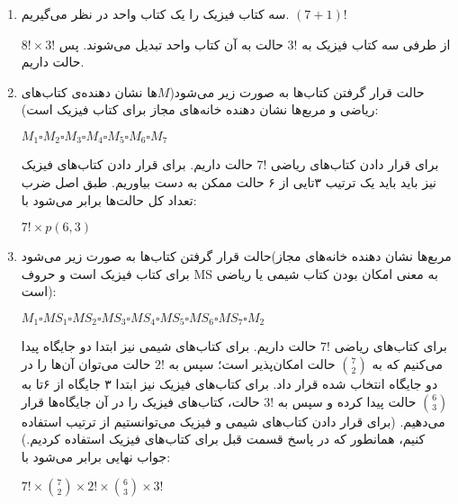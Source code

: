 \begin{enumerate}
  \item 
        سه کتاب فیزیک را یک کتاب واحد در نظر می‌گیریم. 
        $(7+1)!$
        
        از طرفی سه کتاب فیزیک به 
        $3!$ حالت به آن کتاب واحد تبدیل می‌شوند. پس 
        $8!\times3!$ حالت داریم.

  \item
        حالت قرار گرفتن کتاب‌ها به صورت زیر می‌شود($M$‌ها نشان دهنده‌ی کتاب‌های ریاضی و مربع‌ها نشان دهنده خانه‌های مجاز برای کتاب فیزیک است):
        \begin{center}
        $M_{1}\square M_{2}\square M_{3}\square M_{4}\square M_{5}\square M_{6}\square M_{7}$
        \end{center}
        برای قرار دادن کتاب‌های ریاضی
        $7!$ 
        حالت داریم. برای قرار دادن کتاب‌های فیزیک نیز باید باید یک ترتیب ۳‌تایی از ۶ حالت ممکن به دست بیاوریم. طبق اصل ضرب تعداد کل حالت‌ها برابر می‌‌شود با:
        \begin{center}
            $7! \times p(6,3)$
        \end{center}

  \item 
        حالت قرار گرفتن کتاب‌ها به صورت زیر می‌شود(مربع‌ها نشان دهنده خانه‌های مجاز برای کتاب فیزیک است و حروف MS به معنی امکان بودن کتاب شیمی یا ریاضی است):
        \begin{center}
        $M_{1}\square MS_{1}\square MS_{2}\square MS_{3}\square MS_{4}\square MS_{5}\square MS_{6}\square MS_{7}\square M_{2}$
        \end{center}
        برای کتاب‌‌های ریاضی
        $7!$
        حالت داریم. برای کتاب‌های شیمی نیز ابتدا دو جایگاه پیدا می‌کنیم که به 
        ${7\choose 2}$
        حالت امکان‌پذیر است؛ سپس به
        $2!$
        حالت می‌توان آن‌ها را در دو جایگاه انتخاب شده قرار داد. برای کتاب‌های فیزیک نیز ابتدا ۳ جایگاه از ۶‌تا به 
        ${6\choose 3}$
        حالت پیدا کرده و سپس به 
        $3!$
        حالت، کتاب‌های فیزیک را در آن جایگاه‌ها قرار می‌دهیم. (برای قرار دادن کتاب‌های شیمی و فیزیک می‌توانستیم از ترتیب استفاده کنیم، همانطور که در پاسخ قسمت قبل برای کتاب‌های فیزیک استفاده کردیم.) جواب نهایی برابر می‌شود با:
        \begin{center}
        $7! \times {7\choose 2}\times 2!\times {6\choose 3}\times 3!$
        \end{center}
\end{enumerate}